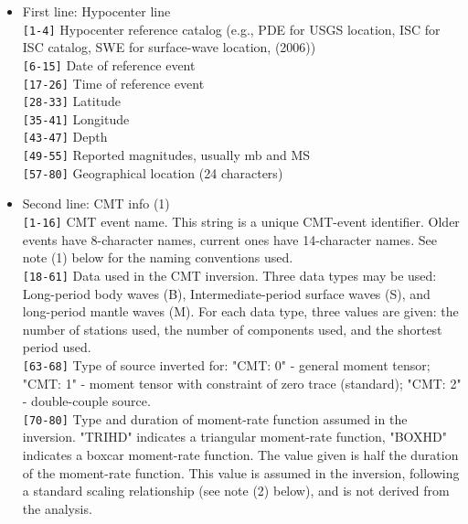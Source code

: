 \begin{itemize}
\item First line: Hypocenter line\\
\verb|[1-4]|   Hypocenter reference catalog (e.g., PDE for USGS location, ISC for
               ISC catalog, SWE for surface-wave location, \textcite{ekst06} (2006))\\
\verb|[6-15]|  Date of reference event\\
\verb|[17-26]| Time of reference event\\
\verb|[28-33]| Latitude\\
\verb|[35-41]| Longitude\\
\verb|[43-47]| Depth\\
\verb|[49-55]| Reported magnitudes, usually mb and MS\\
\verb|[57-80]| Geographical location (24 characters)

\item Second line: CMT info (1)\\
\verb|[1-16]|  CMT event name. This string is a unique CMT-event identifier. Older
        events have 8-character names, current ones have 14-character names.
        See note (1) below for the naming conventions used.\\
\verb|[18-61]| Data used in the CMT inversion. Three data types may be used: 
        Long-period body waves (B), Intermediate-period surface waves (S),
        and long-period mantle waves (M). For each data type, three values
        are given: the number of stations used, the number of components 
        used, and the shortest period used.\\
\verb|[63-68]| Type of source inverted for: "CMT: 0" - general moment tensor; 
        "CMT: 1" - moment tensor with constraint of zero trace (standard); 
        "CMT: 2" - double-couple source.\\
\verb|[70-80]| Type and duration of moment-rate function assumed in the inversion. 
        "TRIHD" indicates a triangular moment-rate function, "BOXHD" indicates
        a boxcar moment-rate function. The value given is half the duration
        of the moment-rate function. This value is assumed in the inversion,
        following a standard scaling relationship (see note (2) below),
        and is not derived from the analysis.
        

\end{itemize}
